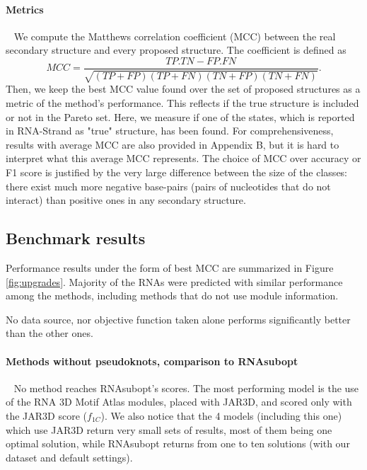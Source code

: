 \documentclass{bioinfo}
\begin{document}
\paragraph{Metrics} ~ We compute the Matthews correlation coefficient (MCC) between the real secondary structure and every proposed structure. The coefficient is defined as
\begin{equation}
   MCC = \frac{TP. TN - FP. FN}{\sqrt{(TP+FP)(TP+FN)(TN+FP)(TN+FN)}}. \label{eq:MCC}
\end{equation}
Then, we keep the best MCC value found over the set of proposed structures as a metric of the method's performance. This reflects if the true structure is included or not in the Pareto set. Here, we measure if one of the states, which is reported in RNA-Strand as "true" structure, has been found. For comprehensiveness, results with average MCC are also provided in Appendix B, but it is hard to interpret what this average MCC represents. The choice of MCC over accuracy or F1 score is justified by the very large difference between the size of the classes: there exist much more negative base-pairs (pairs of nucleotides that do not interact) than positive ones in any secondary structure.

\subsection{Benchmark results}
Performance results under the form of best MCC are summarized in Figure \ref{fig:upgrades}.
Majority of the RNAs were predicted with similar performance among the methods, including methods that do not use module information. 

No data source, nor objective function taken alone performs significantly better than the other ones. 

\paragraph{Methods without pseudoknots, comparison to RNAsubopt} ~ No method reaches RNAsubopt's scores. The most performing model is the use of the RNA 3D Motif Atlas modules, placed with JAR3D, and scored only with the JAR3D score ($f_{1C}$). We also notice that the 4 models (including this one) which use JAR3D return very small sets of results, most of them being one optimal solution, while RNAsubopt returns from one to ten solutions (with our dataset and default settings).
\end{document}

